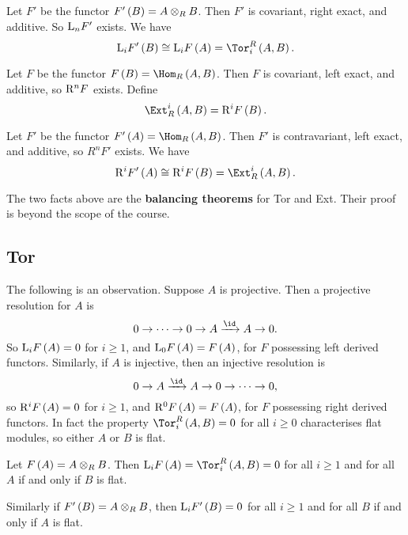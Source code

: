 \begin{fact*}
Let $ F' $ be the functor $ F'\br{B} = A \otimes_R B $. Then $ F' $ is covariant, right exact, and additive. So $ \mathrm{L}_nF' $ exists. We have
$$ \L_iF'\br{B} \cong \L_iF\br{A} = \Tor_i^R\br{A, B}. $$
\end{fact*}

\begin{definition}
Let $ F $ be the functor $ F\br{B} = \Hom_R\br{A, B} $. Then $ F $ is covariant, left exact, and additive, so $ \mathrm{R}^nF $ exists. Define
$$ \Ext_R^i\br{A, B} = \R^iF\br{B}. $$
\end{definition}

\begin{fact*}
Let $ F' $ be the functor $ F'\br{A} = \Hom_R\br{A, B} $. Then $ F' $ is contravariant, left exact, and additive, so $ R^nF' $ exists. We have
$$ \R^iF'\br{A} \cong \R^iF\br{B} = \Ext_R^i\br{A, B}. $$
\end{fact*}

The two facts above are the \textbf{balancing theorems} for Tor and Ext. Their proof is beyond the scope of the course.

\subsection{Tor}

The following is an observation. Suppose $ A $ is projective. Then a projective resolution for $ A $ is
$$ 0 \to \dots \to 0 \to A \xrightarrow{\id} A \to 0. $$
So $ \L_iF\br{A} = 0 $ for $ i \ge 1 $, and $ \L_0F\br{A} = F\br{A} $, for $ F $ possessing left derived functors. Similarly, if $ A $ is injective, then an injective resolution is
$$ 0 \to A \xrightarrow{\id} A \to 0 \to \dots \to 0, $$
so $ \R^iF\br{A} = 0 $ for $ i \ge 1 $, and $ \R^0F\br{A} = F\br{A} $, for $ F $ possessing right derived functors. In fact the property $ \Tor_i^R\br{A, B} = 0 $ for all $ i \ge 0 $ characterises flat modules, so either $ A $ or $ B $ is flat.

\begin{proposition}
Let $ F\br{A} = A \otimes_R B $. Then $ \L_iF\br{A} = \Tor_i^R\br{A, B} = 0 $ for all $ i \ge 1 $ and for all $ A $ if and only if $ B $ is flat.
\end{proposition}

Similarly if $ F'\br{B} = A \otimes_R B $, then $ \L_iF'\br{B} = 0 $ for all $ i \ge 1 $ and for all $ B $ if and only if $ A $ is flat.


